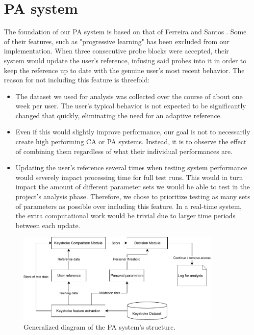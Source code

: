 \section{PA system}
\label{sec:system-design-PA}
The foundation of our PA system is based on that of Ferreira and Santos \cite{superResults}.
Some of their features, such as "progressive learning" has been excluded from our implementation.
When three consecutive probe blocks were accepted, their system would update the user's reference, infusing said probes into it in order to keep the reference up to date with the genuine user's most recent behavior.
The reason for not including this feature is threefold:
\begin{itemize}
    \item The dataset we used for analysis was collected over the course of about one week per user. The user's typical behavior is not expected to be significantly changed that quickly, eliminating the need for an adaptive reference.
    \item Even if this would slightly improve performance, our goal is not to necessarily create high performing CA or PA systems. 
    Instead, it is to observe the effect of combining them regardless of what their individual performances are.
    \item Updating the user's reference several times when testing system performance would severely impact processing time for full test runs. 
    This would in turn impact the amount of different parameter sets we would be able to test in the project's analysis phase.
    Therefore, we chose to prioritize testing as many sets of parameters as possible over including this feature.
    In a real-time system, the extra computational work would be trivial due to larger time periods between each update.
\end{itemize}

\begin{figure}[h]
    \centering
    \includegraphics[width=0.9\textwidth]{figures/PA-diagram.pdf}
    \caption{Generalized diagram of the PA system's structure.}
    \label{fig:PA-diagram}
\end{figure}

